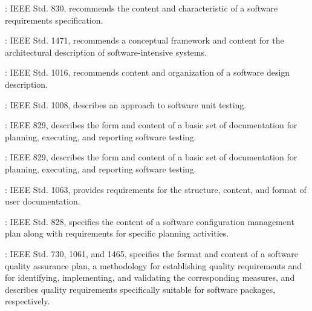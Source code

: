 \begin{adjustwidth}{0.5em}{0pt}
\begin{compactitem}
\begin{compactitem}
			\item {}: IEEE Std. 830, recommends the content and characteristic of a software requirements specification.

			\item {}: IEEE Std. 1471, recommends a conceptual framework and content for the architectural description of software-intensive systems. 

			\item {}: IEEE Std. 1016, recommends content and organization of a software design description.

			\item {}: IEEE Std. 1008, describes an approach to software unit testing.

			\item {}: IEEE 829, describes the form and content of a basic set of documentation for planning, executing, and reporting software testing. 

			\item {}: IEEE 829, describes the form and content of a basic set of documentation for planning, executing, and reporting software testing. 

		\end{compactitem}


		\item {}
		\begin{compactitem}

			\item {}: IEEE Std. 1063, provides requirements for the structure, content, and format of user documentation.

			\item {}: IEEE Std. 828, specifies the content of a software configuration management plan along with requirements for specific planning activities. 

			\item {}: IEEE Std. 730, 1061, and 1465, specifies the format and content of a software quality assurance plan, a methodology for establishing quality requirements and for identifying, implementing, and validating the corresponding measures, and describes quality requirements specifically suitable for software packages, respectively.


\end{compactitem}
\end{compactitem}
\end{adjustwidth}
